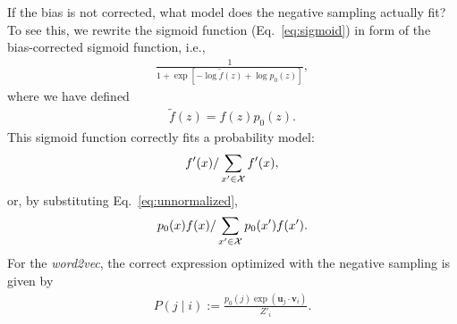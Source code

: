 \documentclass[12pt]{article} %
\def\given{\mid}
\def\ie{i.e.,~}
\begin{document}
If the bias is not corrected, what model does the negative sampling actually fit?
To see this, we rewrite the sigmoid function (Eq.~\eqref{eq:sigmoid}) in form of the bias-corrected sigmoid function, \ie
\begin{align}
    \label{eq:sigmoid3}
    \frac{1}{1 + \exp\left[ - \log \tilde f(z) + \log p_0(z)  \right]},
\end{align}
where we have defined
\begin{align}
    \label{eq:unnormalized}
    \tilde f(z) = f(z) p_0(z).
\end{align}
This sigmoid function correctly fits a probability model:
\begin{align}
    f'(x) / \sum_{x' \in {\cal X}} f'(x),
\end{align}
or, by substituting Eq.~\eqref{eq:unnormalized},
\begin{align}
    p_0(x)f(x) / \sum_{x' \in {\cal X}} p_0(x')f(x').
\end{align}
For the \textit{word2vec}, the correct expression optimized with the negative sampling is given by
\begin{align}
    P\left(j \given i \right):= \frac{p_0(j)\exp(\bm{u}_j \cdot \bm{v}_{i})}{Z'_i}.
\end{align}




\end{document}

